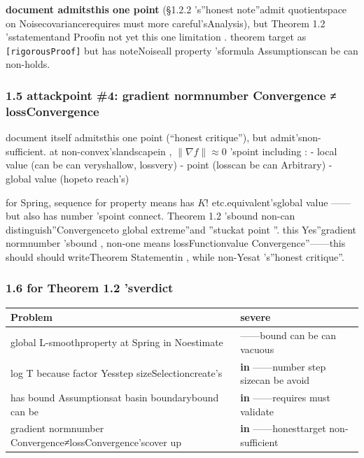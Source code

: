 \documentclass[
  12pt,
]{article}
\begin{document}
\textbf{document admitsthis one point }(§1.2.2
's''honest note''admit quotientspace on Noisecovariancerequires must more careful'sAnalysis), but  Theorem 1.2
'sstatementand Proofin not yet this one limitation . theorem target as  \texttt{{[}rigorousProof{]}}
but has noteNoiseall property 'sformula Assumptionscan be can non-holds. 

\subsubsection{1.5 attackpoint  \#4: gradient normnumber Convergence ≠
lossConvergence}\label{ux653bux51fbux70b9-4ux68afux5ea6ux8303ux6570ux6536ux655b-ux635fux5931ux6536ux655b}

document itself admitsthis one point (``honest critique''), but admit'snon-sufficient. at non-convex'slandscapein , \(\|\nabla f\| \approx 0\)
'spoint including :  - local value (can be can veryshallow, lossvery) - point (losscan be can Arbitrary) -
global value (hopeto reach's)

for  Spring, sequence for property means has  \(K!\)
etc.equivalent'sglobal value ------but also has number 'spoint connect. Theorem 1.2
'sbound non-can distinguish''Convergenceto global extreme''and ''stuckat point ''. this Yes''gradient normnumber 'sbound , non-one means lossFunctionvalue Convergence''------this should should writeTheorem Statementin , while non-Yesat 's''honest critique''. 

\subsubsection{1.6 for  Theorem 1.2
'sverdict}\label{ux5bf9-theorem-1.2-ux7684ux5224ux51b3}

\begin{longtable}[]{@{}ll@{}}
\toprule\noalign{}
Problem & severe \\
\midrule\noalign{}
\endhead
\bottomrule\noalign{}
\endlastfoot
global  L-smoothproperty at  Spring in Noestimate & \textbf{}------bound can be can  vacuous \\
log T because factor Yesstep sizeSelectioncreate's & \textbf{in }------number step sizecan be avoid \\
has bound Assumptionsat basin boundarybound can be  & \textbf{in }------requires must validate  \\
gradient normnumber Convergence≠lossConvergence'scover up & \textbf{in }------honesttarget non-sufficient \\
\end{longtable}
\end{document}
